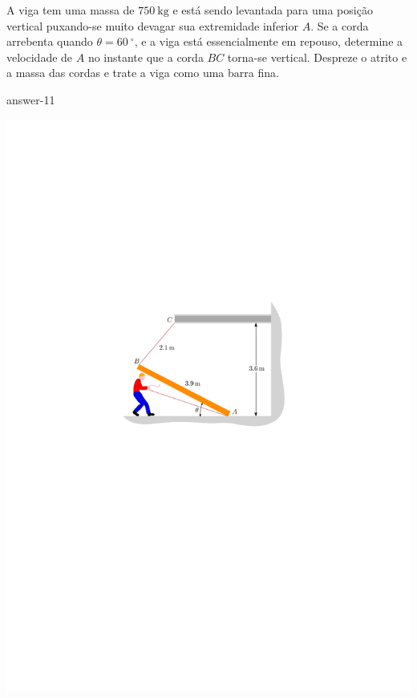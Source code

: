 \item A viga tem uma massa de $\SI{750}{\kilogram}$ e está sendo levantada para uma posição vertical puxando-se muito devagar sua extremidade inferior $A$. Se a corda arrebenta quando $\theta=\SI{60}{^{\circ}}$, e a viga está essencialmente em repouso, determine a velocidade de $A$ no instante que a corda $BC$ torna-se vertical. Despreze o atrito e a massa das cordas e trate a viga como uma barra fina.

{answer-11}

\begin{flushright}
	\includegraphics[scale=1.25]{../../images/draw_4_2}
\end{flushright}
